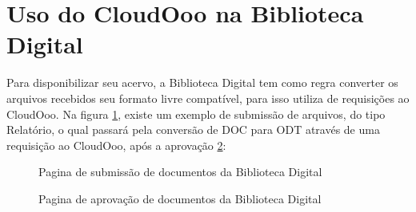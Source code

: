 \section{Uso do CloudOoo na Biblioteca Digital}

Para disponibilizar seu acervo, a Biblioteca Digital tem como regra converter os arquivos recebidos seu formato livre compatível, para isso utiliza de requisições ao CloudOoo. Na figura \ref{submeter}, existe um exemplo de submissão de arquivos, do tipo Relatório, o qual passará pela conversão de DOC para ODT através de uma requisição ao CloudOoo, após a aprovação \ref{aprovar}:

\begin{figure}[ht]
    \centering
    \caption{Pagina de submissão de documentos da Biblioteca Digital}
    \label{submeter}
\end{figure}

\begin{figure}[ht]
    \centering
    \caption{Pagina de aprovação de documentos da Biblioteca Digital}
    \label{aprovar}
\end{figure}

